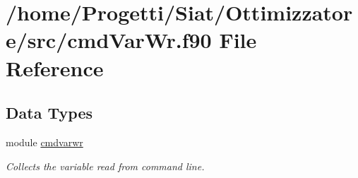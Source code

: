 \hypertarget{cmd_var_wr_8f90}{\section{/home/\-Progetti/\-Siat/\-Ottimizzatore/src/cmd\-Var\-Wr.f90 File Reference}
\label{cmd_var_wr_8f90}
}
\subsection*{Data Types}
\begin{DoxyCompactItemize}
\item 
module \hyperlink{classcmdvarwr}{cmdvarwr}
\begin{DoxyCompactList}\small\item\em Collects the variable read from command line. \end{DoxyCompactList}\end{DoxyCompactItemize}
